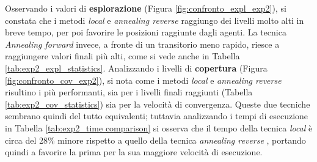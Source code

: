Osservando i valori di \textbf{esplorazione} (Figura \ref{fig:confronto_expl_exp2}), si constata che i metodi \textit{local} e \textit{annealing reverse} raggiungo dei livelli molto alti in breve tempo, per poi favorire le posizioni raggiunte dagli agenti.
La tecnica \textit{Annealing forward} invece, a fronte di un transitorio meno rapido, riesce a raggiungere valori finali più alti, come si vede anche in Tabella \ref{tab:exp2_expl_statistics}.
Analizzando i livelli di \textbf{copertura} (Figura \ref{fig:confronto_cov_exp2}), si nota come i metodi \textit{local} e \textit{annealing reverse} risultino i più performanti, sia per i livelli finali raggiunti (Tabella \ref{tab:exp2_cov_statistics}) sia per la velocità di convergenza.
Queste due tecniche sembrano quindi del tutto equivalenti; tuttavia analizzando i tempi di esecuzione in Tabella \ref{tab:exp2_time comparison} si osserva che il tempo della tecnica \textit{local} è circa del 28\% minore rispetto a quello della tecnica \textit{annealing reverse} , portando quindi a favorire la prima per la sua maggiore velocità di esecuzione.